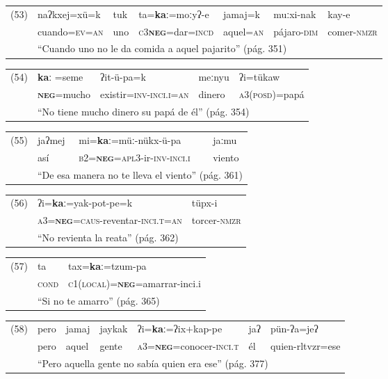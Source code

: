 {\setmainfont{Charis SIL}

{\footnotesize
\noindent \begin{tabular}{lllllll}
(53) & naʔkxej=xü=k & tuk & ta=\textbf{kaː}=moːyʔ-e & jamaj=k & muːxi-nak & kay-e \\
& cuando=\textsc{ev=an} & uno & \textsc{c3\textbf{neg}}=dar=\textsc{incd} & aquel=\textsc{an} & pájaro-\textsc{dim} & comer-\textsc{nmzr} \\
& \multicolumn{6}{l}{``Cuando uno no le da comida a aquel pajarito'' (pág. 351)}
\end{tabular} \vspace{0.2cm}
}

\noindent \begin{tabular}{lllll}
(54) & \textbf{kaː} =seme & ʔit-ü-pa=k & meːnyu & ʔi=tükaw \\
& \textsc{\textbf{neg}}=mucho & existir=\textsc{inv-inci.i=an} & dinero & \textsc{a3(posd)}=papá \\
& \multicolumn{4}{l}{``No tiene mucho dinero su papá de él'' (pág. 354)}
\end{tabular} \vspace{0.2cm}

\noindent \begin{tabular}{llll}
(55) & jaʔmej & mi=\textbf{kaː}=müː-nükx-ü-pa & jaːmu \\
& así & \textsc{b2=\textbf{neg}=apl3}-ir-\textsc{inv-inci.i} & viento \\
& \multicolumn{3}{l}{``De esa manera no te lleva el viento'' (pág. 361)}
\end{tabular} \vspace{0.2cm}

\noindent \begin{tabular}{lll}
(56) & ʔi=\textbf{kaː}=yak-pot-pe=k & tüpx-i \\
& \textsc{a3=\textbf{neg}=caus}-reventar-\textsc{inci.t=an} & torcer-\textsc{nmzr}\\
& \multicolumn{2}{l}{``No revienta la reata'' (pág. 362)}
\end{tabular} \vspace{0.2cm}

\noindent \begin{tabular}{lll}
(57) & ta & tax=\textbf{kaː}=tzum-pa \\
& \textsc{cond} & \textsc{c1(local)=\textbf{neg}}=amarrar-inci.i \\
& \multicolumn{2}{l}{``Si no te amarro'' (pág. 365)}
\end{tabular} \vspace{0.2cm}

{\small
\noindent \begin{tabular}{lllllll}
(58) & pero & jamaj & jaykak & ʔi=\textbf{kaː}=ʔix+kap-pe & jaʔ & pün-ʔa=jeʔ \\
& pero & aquel & gente & \textsc{a3=\textbf{neg}=}conocer-\textsc{inci.t} & él & quien-rltvzr=ese \\
& \multicolumn{6}{l}{``Pero aquella gente no sabía quien era ese'' (pág. 377)}
\end{tabular} \vspace{0.25cm}
}

}

